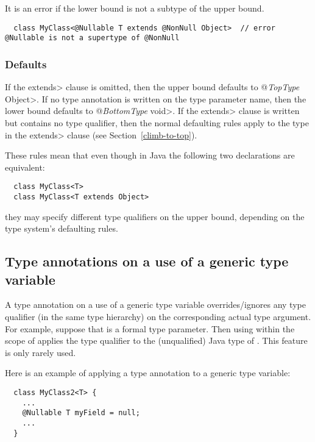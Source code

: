 It is an error if the lower bound is not a subtype of the upper bound.

\begin{Verbatim}
  class MyClass<@Nullable T extends @NonNull Object>  // error @Nullable is not a supertype of @NonNull
\end{Verbatim}


\subsubsection{Defaults\label{generics-defaults}}
If the \<extends> clause is omitted,
then the upper bound defaults to \<@\emph{TopType} Object>.
If no type annotation is written on the type parameter name,
then the lower bound defaults to \<@\emph{BottomType} void>.
If the \<extends> clause is written but contains no type qualifier,
then the normal defaulting rules apply to the type in the \<extends>
clause (see Section~\ref{climb-to-top}).

These rules mean that even though in Java the following two declarations
are equivalent:

\begin{Verbatim}
  class MyClass<T>
  class MyClass<T extends Object>
\end{Verbatim}

\noindent
they may specify different type qualifiers on the upper bound, depending on
the type system's defaulting rules.



\subsection{Type annotations on a use of a generic type variable\label{type-variable-use}}

A type annotation on a use of a generic type variable overrides/ignores any type
qualifier (in the same type hierarchy) on the corresponding actual type
argument.  For example, suppose that  is a formal type parameter.
Then using  within the scope of  applies the type
qualifier  to the (unqualified) Java type of \@.
This feature is only rarely used.

Here is an example of applying a type annotation to a generic type
variable:

\begin{Verbatim}
  class MyClass2<T> {
    ...
    @Nullable T myField = null;
    ...
  }
\end{Verbatim}


